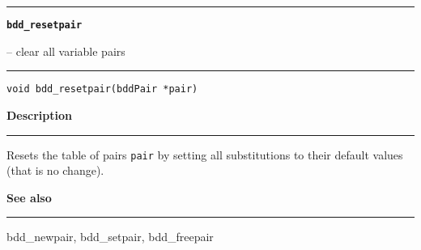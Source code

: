 \begin{minipage}{\textwidth}

\noindent\begin{minipage}{\textwidth}
\rule{\textwidth}{0.5mm}
{\tt\bf bdd\_resetpair }
\--- clear all variable pairs  \hspace{\fill}
\\\rule[1.5ex]{\textwidth}{0.5mm}
\end{minipage}

\noindent\begin{verbatim}
void bdd_resetpair(bddPair *pair) 
\end{verbatim}

\vspace{\parsep}\noindent
{\bf Description}\\\rule[1.5ex]{\textwidth}{0.2mm}\vspace{-1.5ex}\setlength{\parindent}{1em}
Resets the table of pairs {\tt pair} by setting all substitutions
           to their default values (that is no change). 

\vspace{\parsep}\vspace{\baselineskip}\noindent
{\bf See also}\\\rule[1.5ex]{\textwidth}{0.2mm}\vspace{-1.5ex}
bdd\_newpair, bdd\_setpair, bdd\_freepair 
\end{minipage}
\vspace{8ex}
